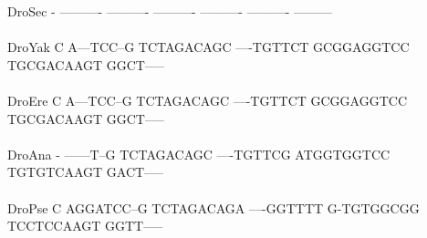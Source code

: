 \documentclass[11pt,twoside,reqno,a4paper]{article}
\begin{document}
{DroSec	-	----------	----------	----------	----------	----------	---------\\
\hspace*{7\charwidth}\hspace*{1\charwidth}\hspace*{1\charwidth}\hspace*{1\charwidth}\hspace*{1\charwidth}\hspace*{1\charwidth}\hspace*{1\charwidth}\\
DroYak	C	A---TCC--G	TCTAGACAGC	----TGTTCT	GCGGAGGTCC	TGCGACAAGT	GGCT-----\\
\hspace*{7\charwidth}\hspace*{1\charwidth}\hspace*{1\charwidth}\hspace*{1\charwidth}\hspace*{1\charwidth}\hspace*{1\charwidth}\hspace*{1\charwidth}\\
DroEre	C	A---TCC--G	TCTAGACAGC	----TGTTCT	GCGGAGGTCC	TGCGACAAGT	GGCT-----\\
\hspace*{7\charwidth}\hspace*{1\charwidth}\hspace*{1\charwidth}\hspace*{1\charwidth}\hspace*{1\charwidth}\hspace*{1\charwidth}\hspace*{1\charwidth}\\
DroAna	-	------T--G	TCTAGACAGC	----TGTTCG	ATGGTGGTCC	TGTGTCAAGT	GACT-----\\
\hspace*{7\charwidth}\hspace*{1\charwidth}\hspace*{1\charwidth}\hspace*{1\charwidth}\hspace*{1\charwidth}\hspace*{1\charwidth}\hspace*{1\charwidth}\\
DroPse	C	AGGATCC--G	TCTAGACAGA	----GGTTTT	G-TGTGGCGG	TCCTCCAAGT	GGTT-----\\
\hspace*{7\charwidth}\hspace*{1\charwidth}\hspace*{1\charwidth}\hspace*{1\charwidth}\hspace*{1\charwidth}\hspace*{1\charwidth}\hspace*{1\charwidth}\\
}
\end{document}

